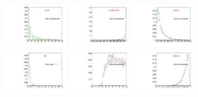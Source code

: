 
\begin{figure}
  \centering
  \includegraphics[width=0.3\textwidth]{Figures/VariablesComparison/MC_barrel_figs_3h/ntrk20}
  \includegraphics[width=0.3\textwidth]{Figures/VariablesComparison/MC_barrel_figs_3h/cosAlpha3D}
  \includegraphics[width=0.3\textwidth]{Figures/VariablesComparison/MC_barrel_figs_3h/minDca}
  \includegraphics[width=0.3\textwidth]{Figures/VariablesComparison/MC_barrel_figs_3h/l3d}
  \includegraphics[width=0.3\textwidth]{Figures/VariablesComparison/MC_barrel_figs_3h/l3dsig}
  \includegraphics[width=0.3\textwidth]{Figures/VariablesComparison/MC_barrel_figs_3h/isolation}

\end{figure}
